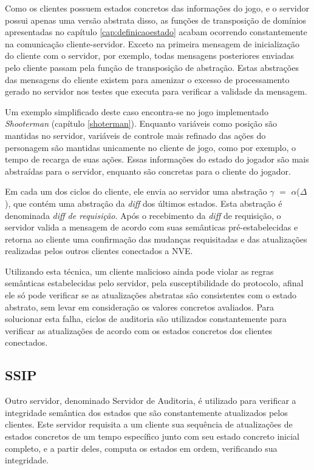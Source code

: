Como os clientes possuem estados concretos das informações do jogo, e o servidor possui apenas uma versão abstrata disso,
as funções de transposição de domínios apresentadas no capítulo \ref{cap:definicaoestado} acabam ocorrendo constantemente na comunicação cliente-servidor. Exceto na primeira mensagem de inicialização do cliente com o servidor, por exemplo, todas mensagens posteriores enviadas pelo cliente passam pela função de transposição de abstração. Estas abstrações das mensagens do cliente existem para amenizar o excesso de processamento gerado no servidor nos testes que executa para verificar a validade da mensagem. 

Um exemplo simplificado deste caso encontra-se no jogo implementado \textit{Shooterman} (capítulo \ref{shoterman}). Enquanto variáveis como posição são mantidas no servidor, variáveis de controle mais refinado das ações do personagem são mantidas unicamente no cliente de jogo, como por exemplo, o tempo de recarga de suas ações. Essas informações do estado do jogador são mais abstraídas para o servidor, enquanto são concretas para o cliente do jogador.

Em cada um dos ciclos do cliente, ele envia ao servidor uma abstração $\gamma$ $=$ $\alpha$($\Delta$), que contém uma abstração da \textit{diff} dos últimos estados. Esta abstração é denominada \textit{diff de requisição}. Após o recebimento da \textit{diff} de requisição, o servidor valida a mensagem de acordo com suas semânticas pré-estabelecidas e retorna ao cliente uma confirmação das mudanças requisitadas e das atualizações realizadas pelos outros clientes conectados a NVE. 

Utilizando esta técnica, um cliente malicioso ainda pode violar as regras semânticas estabelecidas pelo servidor, pela susceptibilidade do protocolo, afinal ele só pode verificar se as atualizações abstratas são consistentes com o estado abstrato, sem levar em consideração os valores concretos avaliados. Para solucionar esta falha, ciclos de auditoria são utilizados constantemente para verificar as atualizações de acordo com os estados concretos dos clientes conectados.

\subsection{SSIP}
Outro servidor, denominado Servidor de Auditoria, é utilizado para verificar a integridade semântica dos estados que são constantemente atualizados pelos clientes. Este servidor requisita a um cliente sua sequência de atualizações de estados concretos de um tempo específico junto com seu estado concreto inicial completo, e a partir deles, computa os estados em ordem, verificando sua integridade.

